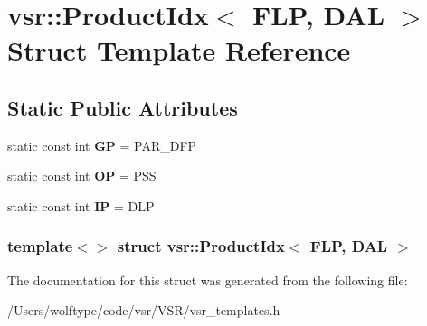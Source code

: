 \hypertarget{structvsr_1_1_product_idx_3_01_f_l_p_00_01_d_a_l_01_4}{\section{vsr\-:\-:Product\-Idx$<$ F\-L\-P, D\-A\-L $>$ Struct Template Reference}
\label{structvsr_1_1_product_idx_3_01_f_l_p_00_01_d_a_l_01_4}
}
\subsection*{Static Public Attributes}
\begin{DoxyCompactItemize}
\item 
\hypertarget{structvsr_1_1_product_idx_3_01_f_l_p_00_01_d_a_l_01_4_a6d81e29ab2f53cbe54cf0610adba04f4}{static const int {\bfseries G\-P} = P\-A\-R\-\_\-\-D\-F\-P}\label{structvsr_1_1_product_idx_3_01_f_l_p_00_01_d_a_l_01_4_a6d81e29ab2f53cbe54cf0610adba04f4}

\item 
\hypertarget{structvsr_1_1_product_idx_3_01_f_l_p_00_01_d_a_l_01_4_a7c69507baff57bda039b1f87e2275e19}{static const int {\bfseries O\-P} = P\-S\-S}\label{structvsr_1_1_product_idx_3_01_f_l_p_00_01_d_a_l_01_4_a7c69507baff57bda039b1f87e2275e19}

\item 
\hypertarget{structvsr_1_1_product_idx_3_01_f_l_p_00_01_d_a_l_01_4_a76bed03467d485e35f0de4da9aa6f5e5}{static const int {\bfseries I\-P} = D\-L\-P}\label{structvsr_1_1_product_idx_3_01_f_l_p_00_01_d_a_l_01_4_a76bed03467d485e35f0de4da9aa6f5e5}

\end{DoxyCompactItemize}
\subsubsection*{template$<$$>$ struct vsr\-::\-Product\-Idx$<$ F\-L\-P, D\-A\-L $>$}



The documentation for this struct was generated from the following file\-:\begin{DoxyCompactItemize}
\item 
/\-Users/wolftype/code/vsr/\-V\-S\-R/vsr\-\_\-templates.\-h\end{DoxyCompactItemize}
